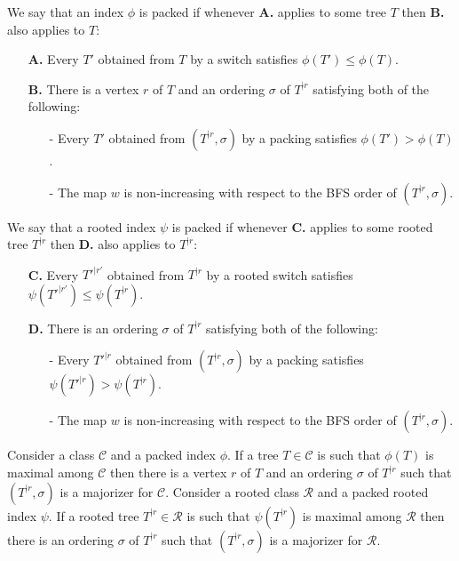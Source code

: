 \documentclass[11 pt]{modarticle}
\newcommand{\wmap}{w}
\newcommand{\rtree}[2]{{#1}^{\lvert #2}}
\newcommand{\ortree}[3]{(\rtree{#1}{#2},{#3})}
\newcommand{\tclass}{\mathcal{C}}
\newcommand{\rtclass}{\mathcal{R}}
\begin{document}
\begin{defi}\label{def:packed}
We say that an index $\phi$ is packed if whenever \textbf{A.} applies to some tree $T$ then \textbf{B.} also applies to $T$:
\begin{itemize}
	\item[\textbf{A.}] Every $T'$ obtained from $T$ by a switch satisfies $\phi(T') \leq \phi(T)$.
	\item[\textbf{B.}] There is a vertex $r$ of $T$ and an ordering $\sigma$ of $\rtree{T}{r}$ satisfying both of the following:
	\begin{itemize}
		\item[-] Every $T'$ obtained from $\ortree{T}{r}{\sigma}$ by a packing satisfies $\phi(T') > \phi(T)$.
		\item[-] The map $\wmap$ is non-increasing with respect to the BFS order of $\ortree{T}{r}{\sigma}$.
	\end{itemize}
\end{itemize}
\end{defi}

\begin{defi}
We say that a rooted index $\psi$ is packed if whenever \textbf{C.} applies to some rooted tree $\rtree{T}{r}$ then \textbf{D.} also applies to $\rtree{T}{r}$:
\begin{itemize}
	\item[\textbf{C.}] Every $\rtree{T'}{r'}$ obtained from $\rtree{T}{r}$ by a rooted switch satisfies $\psi(\rtree{T'}{r'}) \leq \psi(\rtree{T}{r})$.
	\item[\textbf{D.}] There is an ordering $\sigma$ of $\rtree{T}{r}$ satisfying both of the following:
	\begin{itemize}
		\item[-] Every $\rtree{T'}{r}$ obtained from $\ortree{T}{r}{\sigma}$ by a packing satisfies $\psi(\rtree{T'}{r}) > \psi(\rtree{T}{r})$.
		\item[-] The map $\wmap$ is non-increasing with respect to the BFS order of $\ortree{T}{r}{\sigma}$.
	\end{itemize}
\end{itemize}
\end{defi}

\begin{thm}\label{thm:maximal-is-majorizer}
Consider a class $\tclass$ and a packed index $\phi$. If a tree $T \in \tclass$ is such that $\phi(T)$ is maximal among $\tclass$ then there is a vertex $r$ of $T$ and an ordering $\sigma$ of $\rtree{T}{r}$ such that $\ortree{T}{r}{\sigma}$ is a majorizer for $\tclass$. Consider a rooted class $\rtclass$ and a packed rooted index $\psi$. If a rooted tree $\rtree{T}{r} \in \rtclass$ is such that $\psi(\rtree{T}{r})$ is maximal among $\rtclass$ then there is an ordering $\sigma$ of $\rtree{T}{r}$ such that $\ortree{T}{r}{\sigma}$ is a majorizer for $\rtclass$. 
\end{thm}
\end{document}
